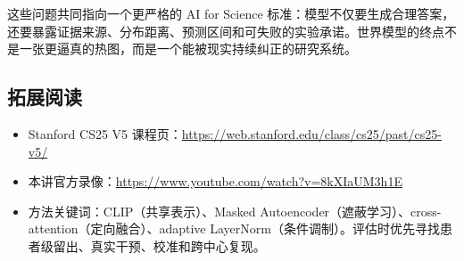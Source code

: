 \documentclass[a4paper]{article}
\begin{document}
这些问题共同指向一个更严格的 AI for Science 标准：模型不仅要生成合理答案，还要暴露证据来源、分布距离、预测区间和可失败的实验承诺。世界模型的终点不是一张更逼真的热图，而是一个能被现实持续纠正的研究系统。

\subsection{拓展阅读}

\begin{itemize}[itemsep=0.2em,topsep=0.2em]
  \item Stanford CS25 V5 课程页：\url{https://web.stanford.edu/class/cs25/past/cs25-v5/}
  \item 本讲官方录像：\url{https://www.youtube.com/watch?v=8kXIaUM3h1E}
  \item 方法关键词：CLIP（共享表示）、Masked Autoencoder（遮蔽学习）、cross-attention（定向融合）、adaptive LayerNorm（条件调制）。评估时优先寻找患者级留出、真实干预、校准和跨中心复现。
\end{itemize}
\end{document}
